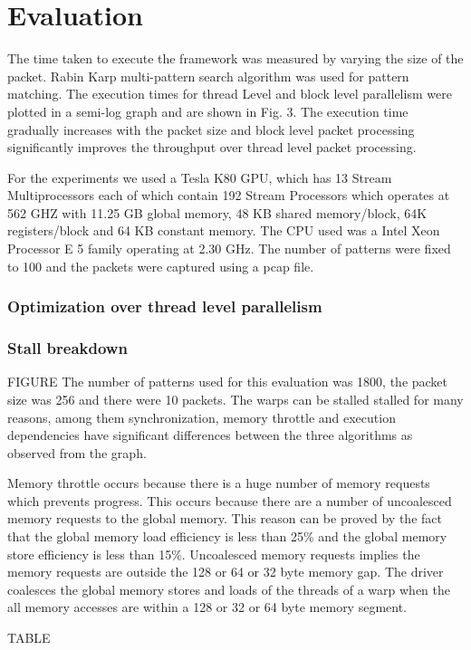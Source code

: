 \chapter{Evaluation}
The time taken to execute the framework was measured by varying the size of the packet. Rabin Karp multi-pattern search algorithm was used for pattern matching. The execution times for thread Level and block level parallelism were plotted in a semi-log graph and are shown in Fig. 3. The execution time gradually increases with the packet size and block level packet processing significantly improves the throughput over thread level packet processing. 

For the experiments we used a Tesla K80 GPU, which has 13 Stream Multiprocessors each of which contain 192 Stream Processors which operates at 562 GHZ with 11.25 GB global memory, 48 KB shared memory/block, 64K registers/block and 64 KB constant memory. The CPU used was a Intel Xeon Processor E 5 family operating at 2.30 GHz. The number of patterns were fixed to 100 and the packets were captured using a pcap file.

\subsection{Optimization over thread level parallelism}

\subsection{Stall breakdown}
FIGURE
The number of patterns used for this evaluation was 1800, the packet size was 256 and there were 10 packets. The warps can be stalled stalled for many reasons, among them synchronization, memory throttle and execution dependencies have significant differences between the three algorithms as observed from the graph.

Memory throttle occurs because there is a huge number of memory requests which prevents progress. This occurs because there are a number of uncoalesced memory requests to the global memory. This reason can be proved by the fact that the global memory load efficiency is less than 25\% and the global memory store efficiency is less than 15\%. Uncoalesced memory requests implies the memory requests are outside the 128 or 64 or 32 byte memory gap. The driver coalesces the global memory stores and loads of the threads of a warp when the all memory accesses are within a 128 or 32 or 64 byte memory segment.

TABLE

